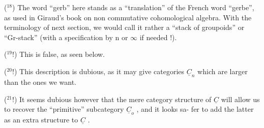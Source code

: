 (${}^{18}$)  The word ``gerb'' here stands  as a ``translation'' of the French
word ``gerbe'',  as used in Giraud's book on non commutative cohomological
algebra.  With the terminology of next section,  we would call it rather
a ``stack of groupoids'' or  ``Gr-stack'' (with a specification by n or $\infty$ if
needed !).

(${}^{19}$!)  This is false,  as seen below.

(${}^{20}$!)  This description is dubious,  as it may give categories $\underline{C}_{n}$ which
are larger than the ones we want.

(${}^{21}$!)  It seems dubious however that the mere category structure of $\underline{C}$ will
allow us to recover the  ``primitive'' subcategory $\underline{C}_{o}$ ,  and it looks sa-%
fer to add the latter as an extra structure to $\underline{C}$ .

